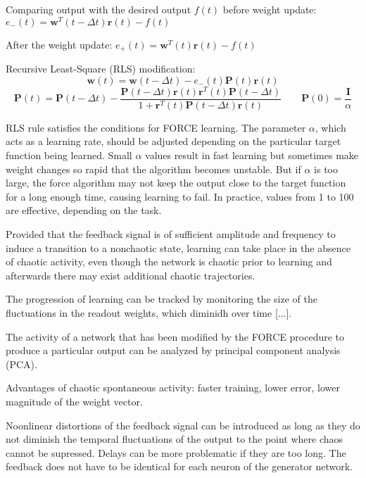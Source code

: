 \documentclass[12pt]{article}
\begin{document}
Comparing output with the desired output $f(t)$ before weight update: $e_-(t) = \mathbf{w}^T(t - \Delta t) \mathbf{r}(t) -f(t)$

After the weight update: $e_+(t) = \mathbf{w}^T(t) \mathbf{r}(t) -f(t)$

Recursive Least-Square (RLS) modification: \begin{equation}
\mathbf{w}(t) = \mathbf{w}(t-\Delta t) - e_-(t) \mathbf{P}(t) \mathbf{r}(t)
\end{equation}
\begin{equation}
\mathbf{P}(t) = \mathbf{P}(t-\Delta t) - \frac{\mathbf{P}(t-\Delta t) \mathbf{r}(t) \mathbf{r}^T(t) \mathbf{P}(t-\Delta t)}{1 + \mathbf{r}^T(t) \mathbf{P}(t-\Delta t) \mathbf{r}(t)} \qquad \mathbf{P}(0) = \frac{\mathbf{I}}{\alpha}
\end{equation}

RLS rule satisfies the conditions for FORCE learning.
The parameter $\alpha$, which acts as a learning rate, should be adjusted depending on the particular target function being learned. Small $\alpha$ values result in fast learning but sometimes make weight changes so rapid that the algorithm becomes unstable. But if $\alpha$ is too large, the force algorithm may not keep the output close to the target function for a long enough time, causing learning to fail. In practice, values from 1 to 100 are effective, depending on the task.

Provided that the feedback signal is of sufficient amplitude and frequency to induce a transition to a nonchaotic state, learning can take place in the absence of chaotic activity, even though the network is chaotic prior to learning and afterwards there may exist additional chaotic trajectories.

The progression of learning can be tracked by monitoring the size of the fluctuations in the readout weights, which diminidh over time [...].

The activity of a network that has been modified by the FORCE procedure to produce a particular output can be analyzed by principal component analysis (PCA).

Advantages of chaotic spontaneous activity: faster training, lower error, lower magnitude of the weight vector.

Noonlinear distortions of the feedback signal can be introduced as long as they do not diminish the temporal fluctuations of the output to the point where chaos cannot be supressed. Delays can be more problematic if they are too long.
The feedback does not have to be identical for each neuron of the generator network.
\end{document}
